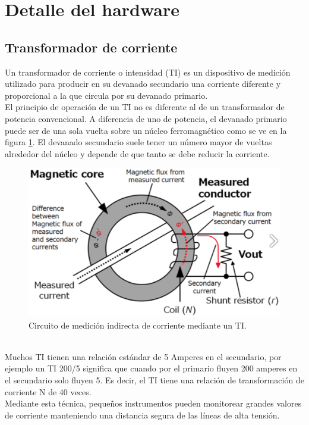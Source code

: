\section{Detalle del hardware}
\subsection{Transformador de corriente}
Un transformador de corriente o intensidad (TI) es un dispositivo de medición utilizado para producir en su devanado secundario una corriente diferente y proporcional a la que circula por su devanado primario.\\
El principio de operación de un TI no es diferente al de un transformador de potencia convencional. A diferencia de uno de potencia, el devanado primario puede ser de una sola vuelta sobre un núcleo ferromagnético como se ve en la figura \ref{fig:dibujomedicionti}. El devanado secundario suele tener un número mayor de vueltas alrededor del núcleo y depende de que tanto se debe reducir la corriente.\\
\begin{figure}[h!]
	\centering
	\includegraphics[width=0.5\linewidth]{Figures/dibujo_medicion_TI}
	\caption{Circuito de medición indirecta de corriente mediante un TI.\citep{hioki}}
	\label{fig:dibujomedicionti}
\end{figure}\\
Muchos TI tienen una relación estándar de 5 Amperes en el secundario, por ejemplo un TI 200/5 significa que cuando por el primario fluyen 200 amperes en el secundario solo fluyen 5. Es decir, el TI tiene una relación de transformación de corriente N de 40 veces.\\
Mediante esta técnica, pequeños instrumentos pueden monitorear grandes valores de corriente manteniendo una distancia segura de las líneas de alta tensión.


